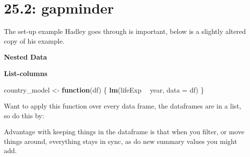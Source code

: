 \documentclass[]{book}
\newenvironment{Shaded}{\begin{snugshade}}{\end{snugshade}}
\newcommand{\ControlFlowTok}[1]{\textcolor[rgb]{0.13,0.29,0.53}{\textbf{#1}}}
\newcommand{\DataTypeTok}[1]{\textcolor[rgb]{0.13,0.29,0.53}{#1}}
\newcommand{\KeywordTok}[1]{\textcolor[rgb]{0.13,0.29,0.53}{\textbf{#1}}}
\newcommand{\NormalTok}[1]{#1}
\newcommand{\OperatorTok}[1]{\textcolor[rgb]{0.81,0.36,0.00}{\textbf{#1}}}
\newcommand{\StringTok}[1]{\textcolor[rgb]{0.31,0.60,0.02}{#1}}
\theoremstyle{definition}
\theoremstyle{definition}
\theoremstyle{definition}
\theoremstyle{remark}
\begin{document}
\hypertarget{gapminder}{%
\section{25.2: gapminder}\label{gapminder}}

The set-up example Hadley goes through is important, below is a slightly
altered copy of his example.

\textbf{Nested Data}

\begin{Shaded}
\end{Shaded}

\textbf{List-columns}

\begin{Shaded}
\begin{Highlighting}[]
\NormalTok{country_model <-}\StringTok{ }\ControlFlowTok{function}\NormalTok{(df) \{}
  \KeywordTok{lm}\NormalTok{(lifeExp }\OperatorTok{~}\StringTok{ }\NormalTok{year, }\DataTypeTok{data =}\NormalTok{ df)}
\NormalTok{\}}
\end{Highlighting}
\end{Shaded}

Want to apply this function over every data frame, the dataframes are in
a list, so do this by:

\begin{Shaded}
\end{Shaded}

Advantage with keeping things in the dataframe is that when you filter,
or move things around, everything stays in sync, as do new summary
values you might add.

\begin{Shaded}
\end{Shaded}
\end{document}
